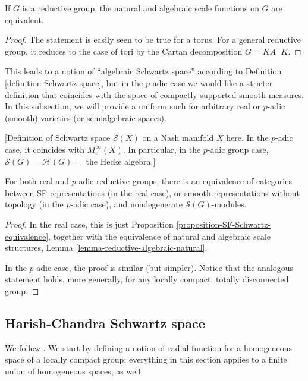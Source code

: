 \begin{lemma}
 \label{lemma-reductive-algebraic-natural}
If $G$ is a reductive group, the natural and algebraic scale functions on $G$ are equivalent.
\end{lemma}

\begin{proof}
 The statement is easily seen to be true for a torus. For a general reductive group, it reduces to the case of tori by the Cartan decomposition $G=K A^+ K$.
\end{proof}

This leads to a notion of ``algebraic Schwartz space'' according to Definition \ref{definition-Schwartz-space}, but in the $p$-adic case we would like a stricter definition that coincides with the space of compactly supported smooth measures. In this subsection, we will provide a uniform such for arbitrary real or $p$-adic (smooth) varieties (or semialgebraic spaces). 

[Definition of Schwartz space $\mathcal S(X)$ on a Nash manifold $X$ here. In the $p$-adic case, it coincides with $M_c^\infty(X)$. In particular, in the $p$-adic group case, $\mathcal S(G)=\mathcal H(G)=$ the Hecke algebra.]

\begin{proposition}
 \label{proposition-smooth-Schwartz-equivalence}
For both real and $p$-adic reductive groups, there is an equivalence of categories between SF-representations (in the real case), or smooth representations without topology (in the $p$-adic case), and nondegenerate $\mathcal S(G)$-modules.
\end{proposition} 

\begin{proof}
 In the real case, this is just Proposition \ref{proposition-SF-Schwartz-equivalence}, together with the equivalence of natural and algebraic scale structures, Lemma \ref{lemma-reductive-algebraic-natural}. 
 
 In the $p$-adic case, the proof is similar (but simpler). Notice that the analogous statement holds, more generally, for any locally compact, totally disconnected group.
\end{proof}

\subsection{Harish-Chandra Schwartz space}
\label{subsection-HC-Schwartz}

We follow \cite{Bernstein-Plancherel}. We start by defining a notion of radial function for a homogeneous space of a locally compact group; everything in this section applies to a finite union of homogeneous spaces, as well.


